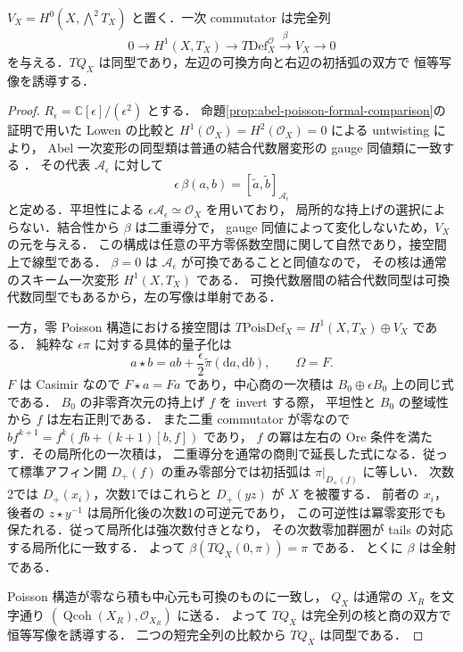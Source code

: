 \begin{proposition}[具体的量子化の接写像]
\label{prop:quantization-tangent-isomorphism}
$V_X=H^0(X,\bigwedge^2T_X)$ と置く．一次 commutator は完全列
\[
 0\longrightarrow H^1(X,T_X)
 \longrightarrow T\mathrm{Def}^{\mathcal O}_X
 \xrightarrow{\,\beta\,}V_X\longrightarrow0
\]
を与える．$TQ_X$ は同型であり，左辺の可換方向と右辺の初括弧の双方で
恒等写像を誘導する．
\end{proposition}
\begin{proof}
$R_\epsilon=\mathbb C[\epsilon]/(\epsilon^2)$ とする．
命題\ref{prop:abel-poisson-formal-comparison}の証明で用いた
Lowen の比較と $H^1(\mathcal O_X)=H^2(\mathcal O_X)=0$ による untwisting により，
Abel 一次変形の同型類は普通の結合代数層変形の gauge 同値類に一致する
\cite[Theorems~3.14,3.26]{Lowen2008}
\cite[Corollary~7.5]{Yekutieli2015}．
その代表 $\mathcal A_\epsilon$ に対して
\[
 \epsilon\,\beta(a,b)
   =[\widetilde a,\widetilde b]_{\mathcal A_\epsilon}
\]
と定める．平坦性による $\epsilon\mathcal A_\epsilon\simeq\mathcal O_X$ を用いており，
局所的な持上げの選択によらない．結合性から $\beta$ は二重導分で，
gauge 同値によって変化しないため，$V_X$ の元を与える．
この構成は任意の平方零係数空間に関して自然であり，接空間上で線型である．
$\beta=0$ は $\mathcal A_\epsilon$ が可換であることと同値なので，
その核は通常のスキーム一次変形 $H^1(X,T_X)$ である．
可換代数層間の結合代数同型は可換代数同型でもあるから，左の写像は単射である．

一方，零 Poisson 構造における接空間は
$T\mathrm{PoisDef}_X=H^1(X,T_X)\oplus V_X$ である．
純粋な $\epsilon\pi$ に対する具体的量子化は
\[
 a\star b=ab+\frac\epsilon2\widetilde\pi(\mathrm da,\mathrm db),
 \qquad\Omega=F.
\]
$F$ は Casimir なので $F\star a=Fa$ であり，中心商の一次積は
$B_0\oplus\epsilon B_0$ 上の同じ式である．
$B_0$ の非零斉次元の持上げ $f$ を invert する際，
平坦性と $B_0$ の整域性から $f$ は左右正則である．
また二重 commutator が零なので
$b f^{k+1}=f^k(fb+(k+1)[b,f])$ であり，
$f$ の冪は左右の Ore 条件を満たす．その局所化の一次積は，
二重導分を通常の商則で延長した式になる．従って標準アフィン開
$D_+(f)$ の重み零部分では初括弧は $\pi|_{D_+(f)}$ に等しい．
次数2では $D_+(x_i)$，次数1ではこれらと $D_+(yz)$ が $X$ を被覆する．
前者の $x_i$，後者の $z\star y^{-1}$ は局所化後の次数1の可逆元であり，
この可逆性は冪零変形でも保たれる．従って局所化は強次数付きとなり，
その次数零加群圏が tails の対応する局所化に一致する．
よって $\beta(TQ_X(0,\pi))=\pi$ である．
とくに $\beta$ は全射である．

Poisson 構造が零なら積も中心元も可換のものに一致し，
$Q_X$ は通常の $X_R$ を文字通り
$(\operatorname{Qcoh}(X_R),\mathcal O_{X_R})$ に送る．
よって $TQ_X$ は完全列の核と商の双方で恒等写像を誘導する．
二つの短完全列の比較から $TQ_X$ は同型である．
\end{proof}

